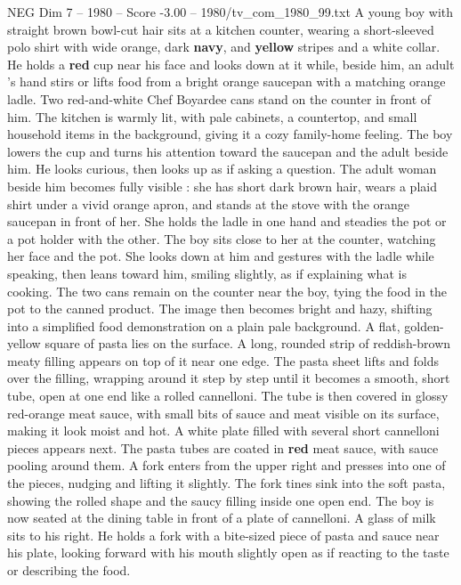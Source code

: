 \begin{textsample}{NEG Dim 7 – 1980 – Score -3.00 – 1980/tv\_com\_1980\_99.txt}  \label{ex:f7_neg_060}
A young boy with straight brown bowl-cut hair sits at a kitchen counter, wearing a short-sleeved polo shirt with wide orange, dark \textbf{navy}, and \textbf{yellow} stripes and a white collar.
He holds a \textbf{red} cup near his face and looks down at it while, beside him, an adult ’s hand stirs or lifts food from a bright orange saucepan with a matching orange ladle.
Two red-and-white Chef Boyardee cans stand on the counter in front of him.
The kitchen is warmly lit, with pale cabinets, a countertop, and small household items in the background, giving it a cozy family-home feeling.
The boy lowers the cup and turns his attention toward the saucepan and the adult beside him.
He looks curious, then looks up as if asking a question.
The adult woman beside him becomes fully visible : she has short dark brown hair, wears a plaid shirt under a vivid orange apron, and stands at the stove with the orange saucepan in front of her.
She holds the ladle in one hand and steadies the pot or a pot holder with the other.
The boy sits close to her at the counter, watching her face and the pot.
She looks down at him and gestures with the ladle while speaking, then leans toward him, smiling slightly, as if explaining what is cooking.
The two cans remain on the counter near the boy, tying the food in the pot to the canned product.
The image then becomes bright and hazy, shifting into a simplified food demonstration on a plain pale background.
A flat, golden-yellow square of pasta lies on the surface.
A long, rounded strip of reddish-brown meaty filling appears on top of it near one edge.
The pasta sheet lifts and folds over the filling, wrapping around it step by step until it becomes a smooth, short tube, open at one end like a rolled cannelloni.
The tube is then covered in glossy red-orange meat sauce, with small bits of sauce and meat visible on its surface, making it look moist and hot.
A white plate filled with several short cannelloni pieces appears next.
The pasta tubes are coated in \textbf{red} meat sauce, with sauce pooling around them.
A fork enters from the upper right and presses into one of the pieces, nudging and lifting it slightly.
The fork tines sink into the soft pasta, showing the rolled shape and the saucy filling inside one open end.
The boy is now seated at the dining table in front of a plate of cannelloni.
A glass of milk sits to his right.
He holds a fork with a bite-sized piece of pasta and sauce near his plate, looking forward with his mouth slightly open as if reacting to the taste or describing the food.

\end{textsample}
